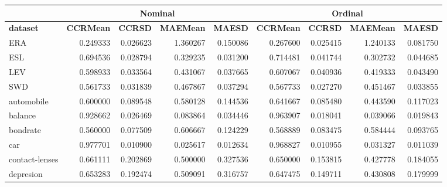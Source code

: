 		\begin{table}
			\centering
			\begin{tabular}{l|r|r|r|r|r|r|r|r}
				\cline{2-9}
				& \multicolumn{4}{c|}{\textbf{Nominal}} & \multicolumn{4}{c|}{\textbf{Ordinal}} \\
				\hline \textbf{dataset} & \textbf{CCRMean} & \textbf{CCRSD} & \textbf{MAEMean} & \textbf{MAESD} & \textbf{CCRMean} & \textbf{CCRSD} & \textbf{MAEMean} & \textbf{MAESD} \\ 
				\hline ERA & \cellcolor{myred} 0.249333 & 0.026623 & \cellcolor{myred} 1.360267 & 0.150086 & \cellcolor{mygreen} 0.267600 & 0.025415 & \cellcolor{mygreen} 1.240133 & 0.081750\\ 
				ESL & \cellcolor{myred} 0.694536 & 0.028794 & \cellcolor{myred} 0.329235 & 0.031200 & \cellcolor{mygreen} 0.714481 & 0.041744 & \cellcolor{mygreen} 0.302732 & 0.044685\\ 
				LEV & \cellcolor{myred} 0.598933 & 0.033564 & \cellcolor{myred} 0.431067 & 0.037665 & \cellcolor{mygreen} 0.607067 & 0.040936 & \cellcolor{mygreen} 0.419333 & 0.043490\\ 
				SWD & \cellcolor{myred} 0.561733 & 0.031839 & \cellcolor{myred} 0.467867 & 0.037294 & \cellcolor{mygreen} 0.567733 & 0.027270 & \cellcolor{mygreen} 0.451467 & 0.033855\\ 
				automobile & \cellcolor{myred} 0.600000 & 0.089548 & \cellcolor{myred} 0.580128 & 0.144536 & \cellcolor{mygreen} 0.641667 & 0.085480 & \cellcolor{mygreen} 0.443590 & 0.117023\\ 
				balance & \cellcolor{myred} 0.928662 & 0.026469 & \cellcolor{myred} 0.083864 & 0.034446 & \cellcolor{mygreen} 0.963907 & 0.018041 & \cellcolor{mygreen} 0.039066 & 0.019843\\ 
				bondrate & \cellcolor{myred} 0.560000 & 0.077509 & \cellcolor{myred} 0.606667 & 0.124229 & \cellcolor{mygreen} 0.568889 & 0.083475 & \cellcolor{mygreen} 0.584444 & 0.093765\\ 
				car & \cellcolor{mygreen} 0.977701 & 0.010900 & \cellcolor{mygreen} 0.025617 & 0.012634 & \cellcolor{myred} 0.968827 & 0.010955 & \cellcolor{myred} 0.031327 & 0.011039\\ 
				contact-lenses & \cellcolor{mygreen} 0.661111 & 0.202869 & \cellcolor{myred} 0.500000 & 0.327536 & \cellcolor{myred} 0.650000 & 0.153815 & \cellcolor{mygreen} 0.427778 & 0.184055\\ 
				depresion & \cellcolor{mygreen} 0.653283 & 0.192474 & \cellcolor{myred} 0.509091 & 0.316757 & \cellcolor{myred} 0.647475 & 0.149711 & \cellcolor{mygreen} 0.430808 & 0.179999\\ 

\end{tabular}
\end{table}
